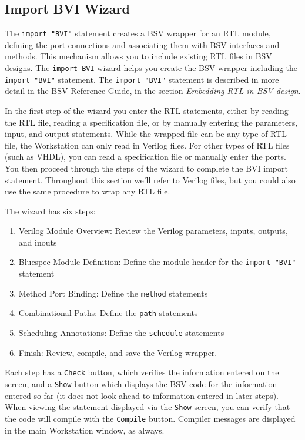 \documentclass{article}
\newcommand{\te}[1]{\texttt{#1}}
\begin{document}

\subsection{Import BVI Wizard}

The \te{import "BVI"} statement creates a BSV wrapper for an RTL
module,  defining the  port connections and associating them with BSV
interfaces and methods.  This mechanism allows you to
include existing RTL files in BSV designs.
  The  \te{import BVI} wizard   helps  you
 create the BSV wrapper including  the
\te{import "BVI"} statement.  The \te{import "BVI"} statement is
described in more detail in the BSV Reference Guide, in the section
{\em Embedding RTL in BSV design}.

In the first step of the wizard you enter the RTL statements, either
by reading   the RTL file,  reading a
specification file, or by manually entering the parameters,  input, and
output statements.
While the wrapped file can be any type of  RTL file,  the
 Workstation can only read in Verilog files.  For other types of RTL
 files (such as VHDL), you can read a specification file or manually
 enter the ports.  You then proceed through the steps of the wizard to
 complete the BVI import statement. Throughout this section we'll refer to
Verilog files, but you could also use the same procedure to wrap any RTL file.


The wizard has six steps:
\begin{enumerate}
\item Verilog Module Overview: Review the Verilog parameters, inputs,
outputs, and inouts
\item Bluespec Module Definition: Define the module header for the
\te{import "BVI"} statement
\item Method Port Binding: Define the \te{method} statements
\item Combinational Paths: Define the \te{path} statements
\item Scheduling Annotations: Define the \te{schedule} statements
\item Finish: Review, compile, and save the Verilog wrapper.
\end{enumerate}

Each step has a \te{Check} button, which verifies the information
entered on the screen, and a \te{Show} button which displays the BSV
code for the information entered so far (it does not look ahead to
information entered in later steps).  When  viewing the statement
displayed via the \te{Show} screen, you
can verify that the code will compile with the \te{Compile} button.
Compiler messages are displayed in the main Workstation window, as always.
\end{document}

